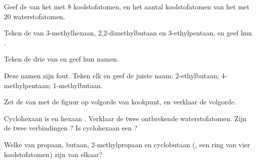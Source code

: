 \begin{exercise}[$\star$]\label{exo:g11:organic-skeletons:5}
Geef de  van het  met 8 koolstofatomen, en het
aantal koolstofatomen van het  met 20 waterstofatomen.
\end{exercise}

\begin{exercise}[$\star\star$]\label{exo:g11:organic-skeletons:6}
Teken de  van 3-methylhexaan, 2,2-dimethylbutaan en
3-ethylpentaan, en geef hun .
\end{exercise}

\begin{exercise}[$\star\star$]\label{exo:g11:organic-skeletons:7}
Teken de drie  van  en geef hun namen.
\end{exercise}

\begin{exercise}[$\star\star$]\label{exo:g11:organic-skeletons:8}
Deze namen zijn fout. Teken elk  en geef de juiste naam:
2-ethylbutaan; 4-methylpentaan; 1-methylbutaan.
\end{exercise}

\begin{exercise}[$\star\star$]\label{exo:g11:organic-skeletons:9}
Zet de  van  met de figuur op volgorde van kookpunt, en
verklaar de volgorde.
\end{exercise}

\begin{exercise}[$\star\star$]\label{exo:g11:organic-skeletons:10}
Cyclohexaan is  en hexaan . Verklaar de twee
ontbrekende waterstofatomen. Zijn de twee verbindingen ? Is
cyclohexaan een ?
\end{exercise}

\begin{exercise}[$\star\star$]\label{exo:g11:organic-skeletons:11}
Welke van propaan, butaan, 2-methylpropaan en cyclobutaan (,
een ring van vier koolstofatomen) zijn  van elkaar?
\end{exercise}

